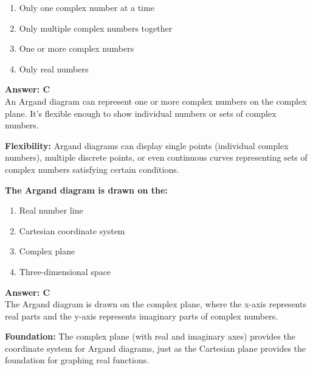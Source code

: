 \documentclass[12pt,a4paper]{article}
\begin{document}
\begin{partbox}[Options]
\begin{enumerate}[label=\Alph*.]
    \item Only one complex number at a time
    \item Only multiple complex numbers together
    \item One or more complex numbers
    \item Only real numbers
\end{enumerate}
\end{partbox}

\begin{answerstyle}
\textbf{Answer: C} \\
An Argand diagram can represent one or more complex numbers on the complex plane. It's flexible enough to show individual numbers or sets of complex numbers.
\end{answerstyle}

\begin{conceptbox}
\textbf{Flexibility:} Argand diagrams can display single points (individual complex numbers), multiple discrete points, or even continuous curves representing sets of complex numbers satisfying certain conditions.
\end{conceptbox}

\newpage
\begin{questiontitle}[MCQ 84]
\textbf{The Argand diagram is drawn on the:}
\end{questiontitle}

\begin{partbox}[Options]
\begin{enumerate}[label=\Alph*.]
    \item Real number line
    \item Cartesian coordinate system
    \item Complex plane
    \item Three-dimensional space
\end{enumerate}
\end{partbox}

\begin{answerstyle}
\textbf{Answer: C} \\
The Argand diagram is drawn on the complex plane, where the x-axis represents real parts and the y-axis represents imaginary parts of complex numbers.
\end{answerstyle}

\begin{conceptbox}
\textbf{Foundation:} The complex plane (with real and imaginary axes) provides the coordinate system for Argand diagrams, just as the Cartesian plane provides the foundation for graphing real functions.
\end{conceptbox}
\end{document}
